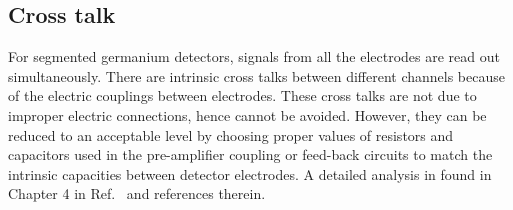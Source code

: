 \subsection{Cross talk}
\label{sec:det:xtalk}
For segmented germanium detectors, signals from all the electrodes are read out simultaneously. There are intrinsic cross talks between different channels because of the electric couplings between electrodes. These cross talks are not due to improper electric connections, hence cannot be avoided. However, they can be reduced to an acceptable level by choosing proper values of resistors and capacitors used in the pre-amplifier coupling or feed-back circuits to match the intrinsic capacities between detector electrodes. A detailed analysis in found in Chapter 4 in Ref.~\cite{Bru06} and references therein.


